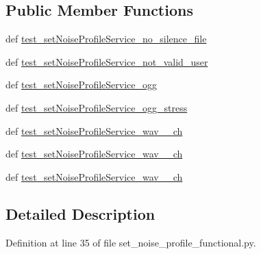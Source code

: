 \subsection*{Public Member Functions}
\begin{DoxyCompactItemize}
\item 
def \hyperlink{classset__noise__profile__functional_1_1AudioProcessingSetNoiseProfileFunc_a3ef448c951814ca99645f5ff4a85e851}{test\-\_\-set\-Noise\-Profile\-Service\-\_\-no\-\_\-silence\-\_\-file}
\item 
def \hyperlink{classset__noise__profile__functional_1_1AudioProcessingSetNoiseProfileFunc_a93b5d6356e18f6dc8ebd930d35c2192b}{test\-\_\-set\-Noise\-Profile\-Service\-\_\-not\-\_\-valid\-\_\-user}
\item 
def \hyperlink{classset__noise__profile__functional_1_1AudioProcessingSetNoiseProfileFunc_ad2eae45e356d7e357a61cf063282b436}{test\-\_\-set\-Noise\-Profile\-Service\-\_\-ogg}
\item 
def \hyperlink{classset__noise__profile__functional_1_1AudioProcessingSetNoiseProfileFunc_a488cabdfe725f1a993a42b7d8c6776d0}{test\-\_\-set\-Noise\-Profile\-Service\-\_\-ogg\-\_\-stress}
\item 
def \hyperlink{classset__noise__profile__functional_1_1AudioProcessingSetNoiseProfileFunc_a0e02d0dbae0d788d73b8170a9d48650b}{test\-\_\-set\-Noise\-Profile\-Service\-\_\-wav\-\_\-\_\-ch}
\item 
def \hyperlink{classset__noise__profile__functional_1_1AudioProcessingSetNoiseProfileFunc_a84cd05103322edf9ed9290785b3493b4}{test\-\_\-set\-Noise\-Profile\-Service\-\_\-wav\-\_\-\_\-ch}
\item 
def \hyperlink{classset__noise__profile__functional_1_1AudioProcessingSetNoiseProfileFunc_a263ecbeb3db73f82958ef45b68a9db30}{test\-\_\-set\-Noise\-Profile\-Service\-\_\-wav\-\_\-\_\-ch}
\end{DoxyCompactItemize}


\subsection{Detailed Description}


Definition at line 35 of file set\-\_\-noise\-\_\-profile\-\_\-functional.\-py.



